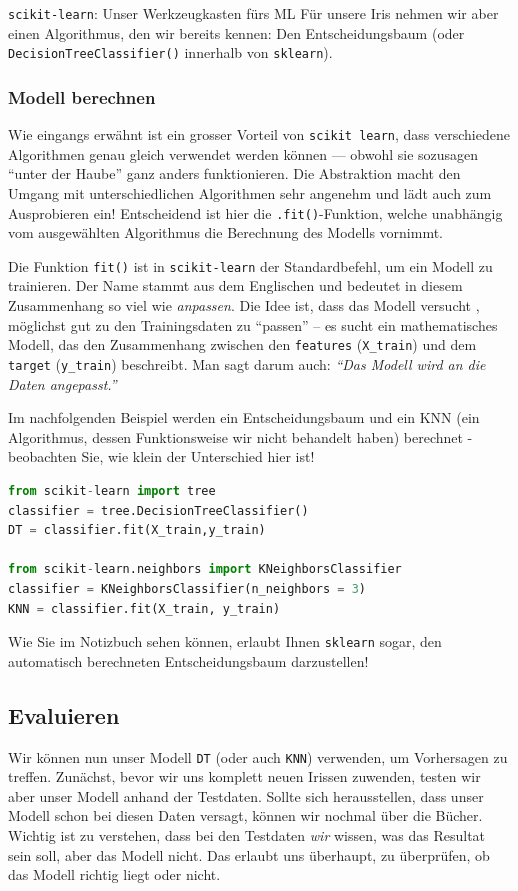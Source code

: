 \begin{lpu}{\texttt{scikit-learn}: Unser Werkzeugkasten fürs ML}
Für unsere Iris nehmen wir aber einen Algorithmus, den wir bereits kennen: Den Entscheidungsbaum (oder \texttt{DecisionTreeClassifier()} innerhalb von \texttt{sklearn}).


\subsubsection*{Modell berechnen}


Wie eingangs erwähnt ist ein grosser Vorteil von \texttt{scikit learn}, dass verschiedene Algorithmen genau gleich verwendet werden können — obwohl sie sozusagen ``unter der Haube'' ganz anders funktionieren. Die Abstraktion macht den Umgang mit unterschiedlichen Algorithmen sehr angenehm und lädt auch zum Ausprobieren ein! Entscheidend ist hier die \texttt{.fit()}-Funktion, welche unabhängig vom ausgewählten Algorithmus die Berechnung des Modells vornimmt.

Die Funktion \texttt{fit()} ist in \texttt{scikit-learn} der Standardbefehl, um ein Modell zu trainieren. Der Name stammt aus dem Englischen und bedeutet in diesem Zusammenhang so viel wie \textit{anpassen}. Die Idee ist, dass das Modell versucht , möglichst gut zu den Trainingsdaten zu ``passen'' – es sucht ein mathematisches Modell, das den Zusammenhang zwischen den \texttt{features} (\texttt{X\_train}) und dem \texttt{target} (\texttt{y\_train}) beschreibt. Man sagt darum auch: \textit{``Das Modell wird an die Daten angepasst.''}

Im nachfolgenden Beispiel werden ein Entscheidungsbaum und ein KNN (ein Algorithmus, dessen Funktionsweise wir nicht behandelt haben) berechnet - beobachten Sie, wie klein der Unterschied hier ist!

\begin{lstlisting}[language=Python]
from scikit-learn import tree
classifier = tree.DecisionTreeClassifier() 
DT = classifier.fit(X_train,y_train)

from scikit-learn.neighbors import KNeighborsClassifier
classifier = KNeighborsClassifier(n_neighbors = 3) 
KNN = classifier.fit(X_train, y_train)
\end{lstlisting}

Wie Sie im Notizbuch sehen können, erlaubt Ihnen \texttt{sklearn} sogar, den automatisch berechneten Entscheidungsbaum darzustellen!

\subsection*{Evaluieren}
Wir können nun unser Modell \texttt{DT} (oder auch \texttt{KNN}) verwenden, um Vorhersagen zu treffen. Zunächst, bevor wir uns komplett neuen Irissen zuwenden, testen wir aber unser Modell anhand der Testdaten. Sollte sich herausstellen, dass unser Modell schon bei diesen Daten versagt, können wir nochmal über die Bücher. Wichtig ist zu verstehen, dass bei den Testdaten \textit{wir} wissen, was das Resultat sein soll, aber das Modell nicht. Das erlaubt uns überhaupt, zu überprüfen, ob das Modell richtig liegt oder nicht.


\end{lpu}
